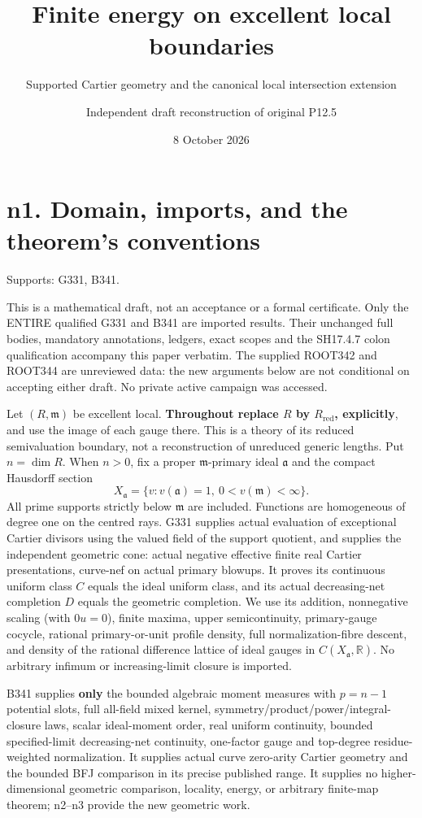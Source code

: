 \documentclass[
  11pt,
]{article}
\title{Finite energy on excellent local boundaries}
\subtitle{Supported Cartier geometry and the canonical local
intersection extension}
\author{Independent draft reconstruction of original P12.5}
\date{8 October 2026}
\begin{document}
\maketitle

{
\setcounter{tocdepth}{3}
\tableofcontents
}
\section{n1. Domain, imports, and the theorem's
conventions}\label{n1.-domain-imports-and-the-theorems-conventions}

Supports: G331, B341.

This is a mathematical draft, not an acceptance or a formal certificate.
Only the ENTIRE qualified G331 and B341 are imported results. Their
unchanged full bodies, mandatory annotations, ledgers, exact scopes and
the SH17.4.7 colon qualification accompany this paper verbatim. The
supplied ROOT342 and ROOT344 are unreviewed data: the new arguments
below are not conditional on accepting either draft. No private active
campaign was accessed.

Let \((R,\mathfrak m)\) be excellent local. \textbf{Throughout replace
\(R\) by \(R_{\mathrm{red}}\), explicitly}, and use the image of each
gauge there. This is a theory of its reduced semivaluation boundary, not
a reconstruction of unreduced generic lengths. Put \(n=\dim R\). When
\(n>0\), fix a proper \(\mathfrak m\)-primary ideal \(\mathfrak a\) and
the compact Hausdorff section
\[X_{\mathfrak a}=\{v:v(\mathfrak a)=1,\ 0<v(\mathfrak m)<\infty\}.\]
All prime supports strictly below \(\mathfrak m\) are included.
Functions are homogeneous of degree one on the centred rays. G331
supplies actual evaluation of exceptional Cartier divisors using the
valued field of the support quotient, and supplies the independent
geometric cone: actual negative effective finite real Cartier
presentations, curve-nef on actual primary blowups. It proves its
continuous uniform class \(C\) equals the ideal uniform class, and its
actual decreasing-net completion \(D\) equals the geometric completion.
We use its addition, nonnegative scaling (with \(0u=0\)), finite maxima,
upper semicontinuity, primary-gauge cocycle, rational primary-or-unit
profile density, full normalization-fibre descent, and density of the
rational difference lattice of ideal gauges in
\(C(X_{\mathfrak a},\mathbb R)\). No arbitrary infimum or
increasing-limit closure is imported.

B341 supplies \textbf{only} the bounded algebraic moment measures with
\(p=n-1\) potential slots, full all-field mixed kernel,
symmetry/product/power/integral-closure laws, scalar ideal-moment order,
real uniform continuity, bounded specified-limit decreasing-net
continuity, one-factor gauge and top-degree residue-weighted
normalization. It supplies actual curve zero-arity Cartier geometry and
the bounded BFJ comparison in its precise published range. It supplies
no higher-dimensional geometric comparison, locality, energy, or
arbitrary finite-map theorem; n2--n3 provide the new geometric work.
\end{document}
